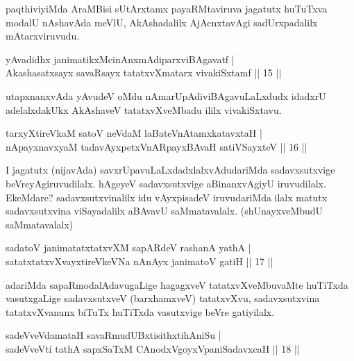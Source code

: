 \begin{artha}
paqthiviyiMda AraMBisi sUtArxtamx payaRMtaviruva jagatutx huTuTxva modalU nAshavAda meVlU, AkAshadalilx AjAcnxtavAgi sadUrxpadalilx mAtarxviruvudu.
\end{artha}

\begin{shl}
yAvadidhx janimatikxMcinAnxmAdiparxviBAgavatf |\\
Akashasatxsayx savaRsayx tatatxvXmatarx vivakiSxtamf \hfill || 15 ||
\end{shl}

\begin{artha}
utapxnanxvAda yAvudeV oMdu nAmarUpAdiviBAgavuLaLxdudx idadxrU adelalxdakUkx AkAshaveV tatatxvXveMbadu ililx vivakiSxtavu.
\end{artha}

\begin{shl}
tarxyXtireVkaM satoV neVdaM laBateV\s nAtamxkatavxtaH |\\
nApayxnavxyaM tadavAyxpetxVnARpayxBAvaH satiVSayxteV \hfill || 16 ||
\end{shl}

\begin{artha}
I jagatutx (nijavAda) savxrUpavuLaLxdadxlalxvAdudariMda sadavxsutxvige beVreyAgiruvudilalx. hAgeyeV sadavxsutxvige aBinanxvAgiyU iruvudilalx. EkeMdare? sadavxsutxvinalilx idu vAyxpisadeV iruvudariMda ilalx matutx sadavxsutxvina viSayadalilx aBAvavU saMmatavalalx. (shUnayxveMbudU saMmatavalalx)
\end{artha}


\begin{shl}
sadatoV janimatatxtatxvXM sapARdeV rashanA yathA |\\
satatxtatxvXvayxtireVkeVNa nAnAyx janimatoV gatiH \hfill || 17 ||
\end{shl}

\begin{artha}%
adariMda sapaRmodalAdavugaLige hagagxveV tatatxvXveMbuvaMte huTiTxda vasutxgaLige sadavxsutxveV (barxhamxveV) tatatxvXvu, sadavxsutxvina tatatxvXvanunx biTuTx huTiTxda vasutxvige beVre gatiyilalx.
\end{artha}


\begin{shl}
sadeVveVdamataH savaRmudUBxtisithxtihAniSu |\\
sadeVveVti tathA sapxSaTxM CAnodxVgoyxVpaniSadavxcaH \hfill || 18 ||
\end{shl}

